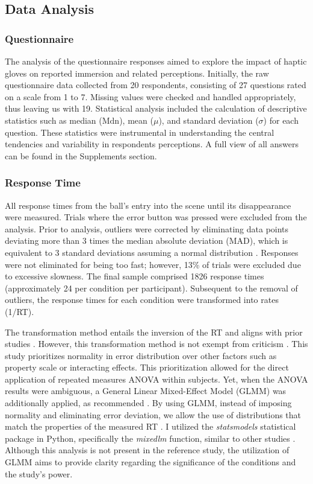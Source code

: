\documentclass[12pt,oneside,openright]{report}
\begin{document}
\subsection*{Data Analysis}

\subsubsection*{Questionnaire}
The analysis of the questionnaire responses aimed to explore the impact of haptic gloves on reported immersion and related perceptions. Initially, the raw questionnaire data collected from 20 respondents, consisting of 27 questions rated on a scale from 1 to 7. Missing values were checked and handled appropriately, thus leaving us with 19. Statistical analysis included the calculation of descriptive statistics such as median ($\text{Mdn}$), mean ($\mu$), and standard deviation ($\sigma$) for each question. These statistics were instrumental in understanding the central tendencies and variability in respondents perceptions. A full view of all answers can be found in the Supplements section. 

\subsubsection*{Response Time}

All response times from the ball's entry into the scene until its disappearance were measured. Trials where the error button was pressed were excluded from the analysis. Prior to analysis, outliers were corrected by eliminating data points deviating more than 3 times the median absolute deviation (MAD), which is equivalent to 3 standard deviations assuming a normal distribution \parencite{Innes2019ACA}. Responses were not eliminated for being too fast; however, 13\% of trials were excluded due to excessive slowness. The final sample comprised 1826 response times (approximately 24 per condition per participant). Subsequent to the removal of outliers, the response times for each condition were transformed into rates (1/RT).

The transformation method entails the inversion of the RT and aligns with prior studies \parencite{Innes2019ACA}. However, this transformation method is not exempt from criticism \parencite{Lo2015-fv}. This study prioritizes normality in error distribution over other factors such as property scale or interacting effects. This prioritization allowed for the direct application of repeated measures ANOVA within subjects. Yet, when the ANOVA results were ambiguous, a General Linear Mixed-Effect Model (GLMM) was additionally applied, as recommended \parencite{Lo2015-fv}. By using GLMM, instead of imposing normality and eliminating error deviation, we allow the use of distributions that match the properties of the measured RT \parencite{Lo2015-fv}. I utilized the \textit{statsmodels} statistical package in Python, specifically the \textit{mixedlm} function, similar to other studies \parencite{RSE_FBI}. Although this analysis is not present in the reference study, the utilization of GLMM aims to provide clarity regarding the significance of the conditions and the study's power.
\end{document}
